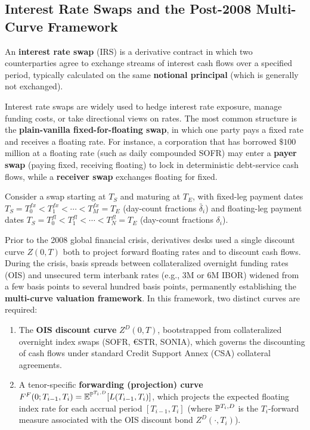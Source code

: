 \subsection*{Interest Rate Swaps and the Post-2008 Multi-Curve Framework}
\begin{definition}\label{def:irs}
    An \textbf{interest rate swap} (IRS) is a derivative contract in which two counterparties agree to exchange streams of interest cash flows over a specified period, typically calculated on the same \textbf{notional principal} (which is generally not exchanged).
\end{definition}

Interest rate swaps are widely used to hedge interest rate exposure, manage funding costs, or take directional views on rates. The most common structure is the \textbf{plain-vanilla fixed-for-floating swap}, in which one party pays a fixed rate and receives a floating rate. For instance, a corporation that has borrowed $\$100$ million at a floating rate (such as daily compounded SOFR) may enter a \textbf{payer swap} (paying fixed, receiving floating) to lock in deterministic debt-service cash flows, while a \textbf{receiver swap} exchanges floating for fixed.

Consider a swap starting at $T_S$ and maturing at $T_E$, with fixed-leg payment dates $T_S = T_0^{fx} < T_1^{fx} < \cdots < T_M^{fx} = T_E$ (day-count fractions $\bar{\delta}_i$) and floating-leg payment dates $T_S = T_0^{fl} < T_1^{fl} < \cdots < T_N^{fl} = T_E$ (day-count fractions $\delta_i$).

Prior to the 2008 global financial crisis, derivatives desks used a single discount curve $Z(0, T)$ both to project forward floating rates and to discount cash flows. During the crisis, basis spreads between collateralized overnight funding rates (OIS) and unsecured term interbank rates (e.g., 3M or 6M IBOR) widened from a few basis points to several hundred basis points, permanently establishing the \textbf{multi-curve valuation framework}. In this framework, two distinct curves are required:
\begin{enumerate}
    \item The \textbf{OIS discount curve} $Z^D(0, T)$, bootstrapped from collateralized overnight index swaps (SOFR, €STR, SONIA), which governs the discounting of cash flows under standard Credit Support Annex (CSA) collateral agreements.
    \item A tenor-specific \textbf{forwarding (projection) curve} $F^F(0; T_{i-1}, T_i) = \mathbb{E}^{\mathbb{P}^{T_i, D}}[L(T_{i-1}, T_i)]$, which projects the expected floating index rate for each accrual period $[T_{i-1}, T_i]$ (where $\mathbb{P}^{T_i, D}$ is the $T_i$-forward measure associated with the OIS discount bond $Z^D(\cdot, T_i)$).
\end{enumerate}

